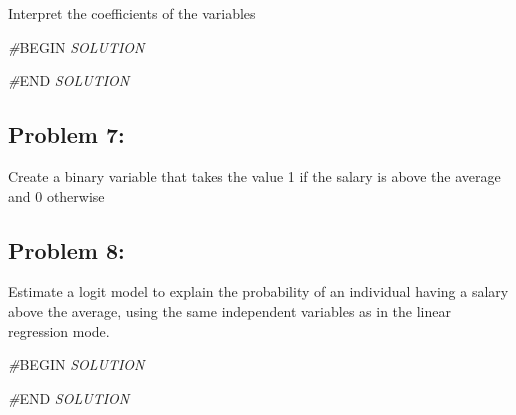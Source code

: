 \documentclass[
]{article}
\newenvironment{Shaded}{\begin{snugshade}}{\end{snugshade}}
\newcommand{\AttributeTok}[1]{\textcolor[rgb]{0.13,0.29,0.53}{#1}}
\newcommand{\CommentTok}[1]{\textcolor[rgb]{0.56,0.35,0.01}{\textit{#1}}}
\newcommand{\DecValTok}[1]{\textcolor[rgb]{0.00,0.00,0.81}{#1}}
\newcommand{\FunctionTok}[1]{\textcolor[rgb]{0.13,0.29,0.53}{\textbf{#1}}}
\newcommand{\NormalTok}[1]{#1}
\newcommand{\OtherTok}[1]{\textcolor[rgb]{0.56,0.35,0.01}{#1}}
\newcommand{\RegionMarkerTok}[1]{#1}
\newcommand{\SpecialCharTok}[1]{\textcolor[rgb]{0.81,0.36,0.00}{\textbf{#1}}}
\begin{document}
Interpret the coefficients of the variables

\begin{Shaded}
\begin{Highlighting}[]
\CommentTok{\#}\RegionMarkerTok{BEGIN}\CommentTok{ SOLUTION}

\CommentTok{\#}\RegionMarkerTok{END}\CommentTok{ SOLUTION}
\end{Highlighting}
\end{Shaded}

\subsection{Problem 7:}\label{problem-7}

Create a binary variable that takes the value 1 if the salary is above
the average and 0 otherwise

\begin{Shaded}
\end{Shaded}

\subsection{Problem 8:}\label{problem-8}

Estimate a logit model to explain the probability of an individual
having a salary above the average, using the same independent variables
as in the linear regression mode.

\begin{Shaded}
\begin{Highlighting}[]
\CommentTok{\#}\RegionMarkerTok{BEGIN}\CommentTok{ SOLUTION}

\CommentTok{\#}\RegionMarkerTok{END}\CommentTok{ SOLUTION}
\end{Highlighting}
\end{Shaded}
\end{document}
